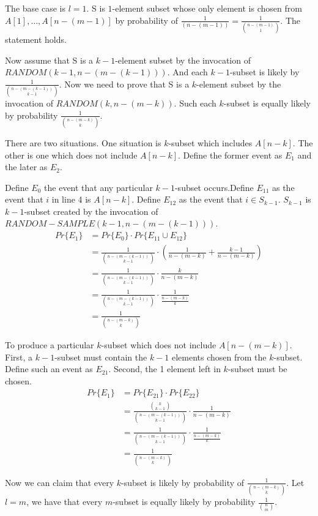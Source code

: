 \documentclass{book}
\begin{document}
\begin{CJK}{UTF8}{gkai}
The base case is $l=1$.  S is $1$-element subset whose only element is chosen 
from $A[1], \dots, A[n-(m-1)]$ by probability of 
$\frac{1}{(n-(m-1))}=\frac{1}{\binom{n-(m-1)}{1}}$. The statement holds.

Now assume that S is a $k-1$-element subset by the invocation of $RANDOM(k-1, 
n-(m-(k-1)))$.  And each $k-1$-subset is likely by 
$\frac{1}{\binom{n-(m-(k-1))}{k-1}}$.  Now we need to prove that S is a 
$k$-element subset by the invocation of $RANDOM(k, n-(m-k))$.  Such each 
$k$-subset is equally likely by probability $\frac{1}{\binom{n-(m-k)}{k}}$.

There are two situations. One situation is $k$-subset which includes $A[n-k]$.  
The other is one which does not include $A[n-k]$. Define the former event as 
$E_1$ and the later as $E_2$.

Define $E_0$ the event that any particular $k-1$-subset occurs.Define $E_{11}$ 
as the event that $i$ in line 4 is $A[n-k]$.  Define $E_{12}$ as the event that 
$i \in S_{k-1}$. $S_{k-1}$ is $k-1$-subset created by the invocation of 
$RANDOM-SAMPLE(k-1, n-(m-(k-1)))$.
\begin{align*}
Pr\{E_1\} & = Pr\{E_0\}\cdot Pr\{E_{11} \cup E_{12}\} \\
& = \frac{1}{\binom{n-(m-(k-1))}{k-1}}\cdot(\frac{1}{n-(m-k)} + 
\frac{k-1}{n-(m-k)}) \\
& = \frac{1}{\binom{n-(m-(k-1))}{k-1}}\cdot\frac{k}{n-(m-k)} \\
& = \frac{1}{\binom{n-(m-(k-1))}{k-1}}\cdot\frac{1}{\frac{n-(m-k)}{k}} \\
& = \frac{1}{\binom{n-(m-k)}{k}}
\end{align*}

To produce a particular $k$-subset which does not include $A[n-(m-k)]$. First,  
a $k-1$-subset must contain the $k-1$ elements chosen from the $k$-subset.  
Define such an event as $E_21$. Second, the 1 element left in $k$-subset must be 
chosen.
\begin{align*}
Pr\{E_1\} & = Pr\{E_{21}\}\cdot Pr\{E_{22}\} \\
& = \frac{\binom{k}{k-1}}{\binom{n-(m-(k-1))}{k-1}} \cdot \frac{1}{n-(m-k)} \\
& = \frac{1}{\binom{n-(m-(k-1))}{k-1}} \cdot \frac{1}{\frac{n-(m-k)}{k}} \\
& = \frac{1}{\binom{n-(m-k)}{k}}
\end{align*}

Now we can claim that every $k$-subset is likely by probability of 
$\frac{1}{\binom{n-(m-k)}{k}}$. Let $l=m$, we have that every $m$-subset is 
equally likely by probability $\frac{1}{\binom{n}{m}}$.


\end{CJK}
\end{document}

